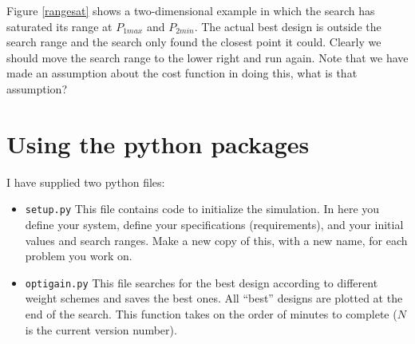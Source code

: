 Figure \ref{rangesat} shows a two-dimensional example in which the search has saturated its range at $P_{1max}$ and $P_{2min}$.  The actual best design is outside the search range and the search only found the closest point it could.   Clearly we should move the search range to the lower right and run again.   Note that we have made an assumption about the cost function in doing this, what is that assumption?	%





\section{Using the python packages}

I have supplied two python files:
\begin{itemize}
  \item {\tt setup.py}
This file contains code to initialize the simulation.  In here you define your system, define your specifications (requirements), and your initial values and search ranges.  Make a new copy of this, with a new name, for each problem you work on.
  \item {\tt optigain.py}
  This file searches for the best design according to different weight schemes and saves the best ones.  All ``best'' designs are plotted at the end of the search.  This function takes on the order of minutes to complete ($N$ is the current version number).
\end{itemize}



%
%
%
%
%



